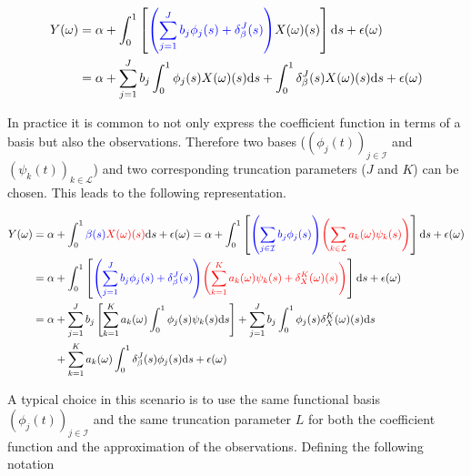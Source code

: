 \documentclass[11pt,twoside,a4paper]{article}
\begin{document}
	\begin{equation}
		\begin{split}
			Y(\omega) & = \alpha + \int_{0}^{1}\left[{\color{blue}\left(\sum_{j = 1}^{J} b_j \phi_j(s) + \delta_{\beta}^{J}(s)\right)} X(\omega)(s) \right]\mathrm{d}s + \epsilon(\omega) \\
			& = \alpha + \sum_{j = 1}^{J} b_j \int_{0}^{1} \phi_j(s) X(\omega)(s) \mathrm{d}s +  \int_{0}^{1} \delta_{\beta}^{J}(s) X(\omega)(s) \mathrm{d}s + \epsilon(\omega)
		\end{split}
	\end{equation}

	In practice it is common to not only express the coefficient function in terms of a basis but also the observations. Therefore two bases ($\left(\phi_j(t)\right)_{j \in \mathcal{I}}$ and $\left(\psi_k(t)\right)_{k \in \mathcal{L}}$) and two corresponding truncation parameters ($J$ and $K$) can be chosen. This leads to the following representation.
	
	\begin{equation}
		\begin{split}
			Y(\omega) & = \alpha + \int_{0}^{1} {\color{blue}\beta(s)} {\color{red}X(\omega)(s)}\mathrm{d}s + \epsilon(\omega)
			 = \alpha + \int_{0}^{1}\left[{\color{blue}\left(\sum_{j \in \mathcal{I}} b_j  \phi_j(s)\right)} {\color{red}\left(\sum_{k \in \mathcal{L}} a_k(\omega)  \psi_k(s)\right)} \right]\mathrm{d}s + \epsilon(\omega) \\
			& = \alpha + \int_{0}^{1}\left[{\color{blue}\left(\sum_{j = 1}^{J} b_j  \phi_j(s) + \delta_{\beta}^{J}(s)\right)} {\color{red}\left(\sum_{k = 1}^K a_k(\omega)  \psi_k(s) + \delta_{X}^{K}(\omega)(s)\right)} \right]\mathrm{d}s + \epsilon(\omega)\\
			& = \alpha + \sum_{j = 1}^J b_j \left[\sum_{k = 1}^K a_k(\omega) \int_{0}^{1} \phi_j(s) \psi_k(s) \mathrm{d}s\right] + \sum_{j = 1}^{J} b_j  \int_{0}^{1} \phi_j(s) \delta_{X}^{K}(\omega)(s) \mathrm{d}s\\
			& \quad \quad + \sum_{k = 1}^{K} a_k(\omega)  \int_{0}^{1} \delta_{\beta}^{J}(s)\phi_j(s) \mathrm{d}s + \epsilon(\omega)
		\end{split}
	\end{equation}

	A typical choice in this scenario is to use the same functional basis $\left(\phi_j(t)\right)_{j \in \mathcal{I}}$ and the same truncation parameter $L$ for both the coefficient function and the approximation of the observations. Defining the following notation 
\end{document}
